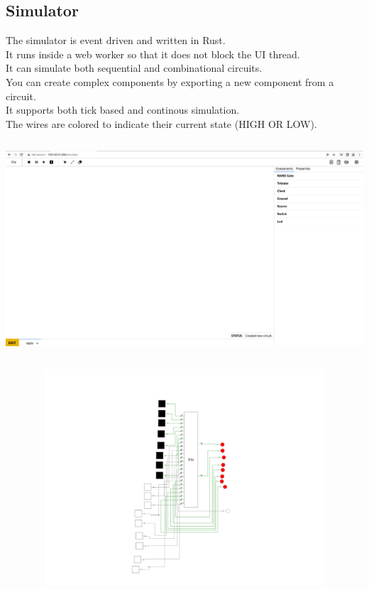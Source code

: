 \documentclass[12pt]{article}
\begin{document}
\subsection{Simulator}
The simulator is event driven and written in Rust.\\
It runs inside a web worker so that it does not block the UI thread.\\
It can simulate both sequential and combinational circuits.\\
You can create complex components by exporting a new component from a circuit.\\
It supports both tick based and continous simulation.\\
The wires are colored to indicate their current state (HIGH OR LOW).\\
\begin{center}
    \includegraphics[width=20cm, height=8cm]{simulator.png}
\end{center}

\begin{center}
    \includegraphics[width=20cm, height=8cm]{8_bit.png}
\end{center}
\end{document}

